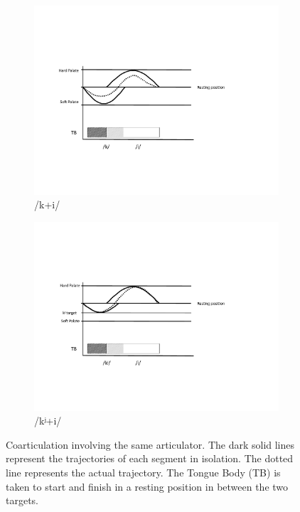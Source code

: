 \begin{figure}[H]

\begin{subfigure}[t]{.45\textwidth}
        \includegraphics[width=\linewidth]{figures/palatalizationa.pdf}
        \caption{\label{fig:/k+i}/k+i/}
    \end{subfigure}\hfill
    \begin{subfigure}[t]{.45\textwidth}
        \includegraphics[width=\linewidth]{figures/palatalizationb.pdf}
        \caption{\label{fig:/k=0002B2+i/} {/kʲ+i/}}
    \end{subfigure}
    
    

\caption{Coarticulation involving the same articulator. The dark solid lines
represent the trajectories of each segment in isolation. The dotted
line represents the actual trajectory. The Tongue Body (TB) is taken
to start and finish in a resting position in between the two targets. }
\end{figure}

